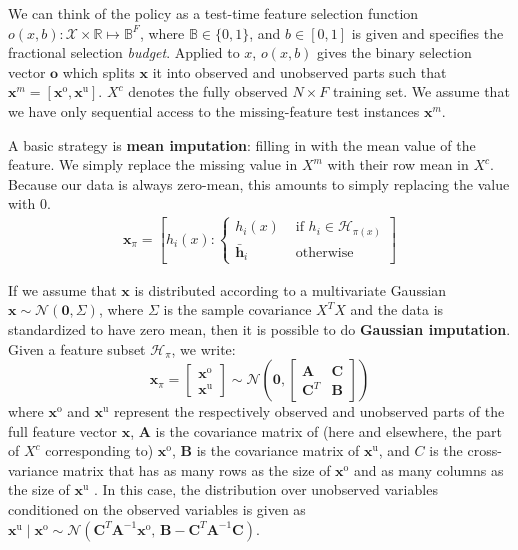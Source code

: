 We can think of the policy as a test-time feature selection function $o(x, b): \mathcal{X} \times \mathbb{R} \mapsto \mathbb{B}^F$, where $\mathbb{B} \in \{0, 1\}$, and $b \in [0, 1]$ is given and specifies the fractional selection \emph{budget}.
Applied to $x$, $o(x, b)$ gives the binary selection vector $\mathbf{o}$ which splits $\mathbf{x}$ it into observed and unobserved parts such that $\mathbf{x}^m = [\mathbf{x}^\text{o}, \mathbf{x}^\text{u}]$.
$X^c$ denotes the fully observed $N \times F$ training set.
We assume that we have only sequential access to the missing-feature test instances $\mathbf{x}^m$.

A basic strategy is \textbf{mean imputation}: filling in with the mean value of the feature.
We simply replace the missing value in $X^m$ with their row mean in $X^c$.
Because our data is always zero-mean, this amounts to simply replacing the value with $0$.
\begin{align}
\mathbf{x}_\pi = \left[ h_i(x) : \left\{ \begin{array}{rl}
 h_i(x) &\mbox{ if $h_i \in \mathcal{H}_{\pi(x)}$} \\
 \bar{\mathbf{h}}_i &\mbox{ otherwise}
\end{array} \right. \right]
\end{align}

If we assume that $\mathbf{x}$ is distributed according to a multivariate Gaussian $\mathbf{x} \sim \mathcal{N}(\mathbf{0}, \Sigma)$, where $\Sigma$ is the sample covariance $X^T X$ and the data is standardized to have zero mean, then it is possible to do \textbf{Gaussian imputation}.
Given a feature subset $\mathcal{H}_\pi$, we write:
\begin{equation}
\mathbf{x}_\pi = \begin{bmatrix} \mathbf{x}^\text{o}\\  \mathbf{x}^\text{u} \end{bmatrix} \sim \mathcal{N} \left( \mathbf{0}, \begin{bmatrix} \mathbf{A} & \mathbf{C}\\ \mathbf{C}^T & \mathbf{B} \end{bmatrix} \right)
\end{equation}
where $\mathbf{x}^\text{o}$ and $\mathbf{x}^\text{u}$ represent the respectively observed and unobserved parts of the full feature vector $\mathbf{x}$, $\mathbf{A}$ is the covariance matrix of (here and elsewhere, the part of $X^c$ corresponding to) $\mathbf{x}^\text{o}$, $\mathbf{B}$ is the covariance matrix of $\mathbf{x}^\text{u}$, and $C$ is the cross-variance matrix that has as many rows as the size of $\mathbf{x}^\text{o}$ and as many columns as the size of $\mathbf{x}^\text{u}$ \parencite{Roweis-gaussian-identities}.
In this case, the distribution over unobserved variables conditioned on the observed variables is given as
$\mathbf{x}^\text{u} \mid \mathbf{x}^\text{o} \sim \mathcal{N} \left( \mathbf{C}^T \mathbf{A}^{-1} \mathbf{x}^\text{o},\, \mathbf{B} - \mathbf{C}^T \mathbf{A}^{-1} \mathbf{C} \right)$.

